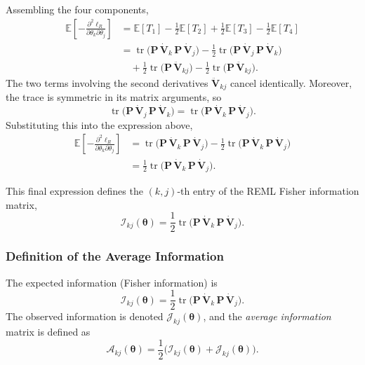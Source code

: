 \documentclass[
  letterpaper,
  DIV=11,
  numbers=noendperiod]{scrartcl}
\begin{document}
Assembling the four components, \begin{align}
\mathbb{E}\!\left[ -\frac{\partial^2 \ell_R}{\partial \theta_k \partial \theta_j} \right]
&= \mathbb{E}[T_1] - \frac12 \mathbb{E}[T_2] + \frac12 \mathbb{E}[T_3] - \frac12 \mathbb{E}[T_4] \\[4pt]
&= \operatorname{tr}\!\big( \symbf{P}\,\dot{\symbf{V}}_k\,\symbf{P}\,\dot{\symbf{V}}_j \big)
- \frac12 \operatorname{tr}\!\big( \symbf{P}\,\dot{\symbf{V}}_j\,\symbf{P}\,\dot{\symbf{V}}_k \big) \\
&\quad + \frac12 \operatorname{tr}\!\big( \symbf{P}\,\ddot{\symbf{V}}_{kj} \big)
- \frac12 \operatorname{tr}\!\big( \symbf{P}\,\ddot{\symbf{V}}_{kj} \big).
\end{align} The two terms involving the second derivatives
\(\ddot{\symbf{V}}_{kj}\) cancel identically. Moreover, the trace is
symmetric in its matrix arguments, so \begin{equation}
\operatorname{tr}\!\big( \symbf{P}\,\dot{\symbf{V}}_j\,\symbf{P}\,\dot{\symbf{V}}_k \big)
= \operatorname{tr}\!\big( \symbf{P}\,\dot{\symbf{V}}_k\,\symbf{P}\,\dot{\symbf{V}}_j \big).
\end{equation} Substituting this into the expression above,
\begin{align}
\mathbb{E}\!\left[ -\frac{\partial^2 \ell_R}{\partial \theta_k \partial \theta_j} \right]
&= \operatorname{tr}\!\big( \symbf{P}\,\dot{\symbf{V}}_k\,\symbf{P}\,\dot{\symbf{V}}_j \big)
- \frac12 \operatorname{tr}\!\big( \symbf{P}\,\dot{\symbf{V}}_k\,\symbf{P}\,\dot{\symbf{V}}_j \big) \\[4pt]
&= \frac12 \operatorname{tr}\!\big( \symbf{P}\,\dot{\symbf{V}}_k\,\symbf{P}\,\dot{\symbf{V}}_j \big).
\end{align}

This final expression defines the \((k,j)\)-th entry of the REML Fisher
information matrix, \begin{equation}
\mathcal{I}_{kj}(\symbf{\theta}) = \frac12 \operatorname{tr}\!\big( \symbf{P}\,\dot{\symbf{V}}_k\,\symbf{P}\,\dot{\symbf{V}}_j \big).
\end{equation}

\subsubsection{Definition of the Average
Information}\label{definition-of-the-average-information}

The expected information (Fisher information) is \begin{equation}
\mathcal{I}_{kj}(\symbf{\theta}) = \frac12 \operatorname{tr}\!\big( \symbf{P}\,\dot{\symbf{V}}_k\,\symbf{P}\,\dot{\symbf{V}}_j \big).
\end{equation} The observed information is denoted
\(\mathcal{J}_{kj}(\symbf{\theta})\), and the \emph{average information}
matrix is defined as \begin{equation}
\mathcal{A}_{kj}(\symbf{\theta}) = \frac12 \Big( \mathcal{I}_{kj}(\symbf{\theta}) + \mathcal{J}_{kj}(\symbf{\theta}) \Big).
\end{equation}
\end{document}
